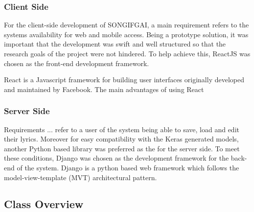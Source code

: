 \subsubsection{Client Side}
For the client-side development of SONGIFGAI, a main requirement refers to the systems availability for web and mobile access. Being a prototype solution, it was important that the development was swift and well structured so that the research goals of the project were not hindered. To help achieve this, ReactJS was chosen as the front-end development framework.

\noindent
\newline
React is a Javascript framework for building user interfaces originally developed and maintained by Facebook. The main advantages of using React
\subsubsection{Server Side}
Requirements ... refer to a user of the system being able to save, load and edit their lyrics. Moreover for easy compatibility with the Keras generated models, another Python based library was preferred as the for the server side. To meet these conditions, Django was chosen as the development framework for the back-end of the system. Django is a python based web framework which follows the model-view-template (MVT) architectural pattern.
\subsection{Class Overview}